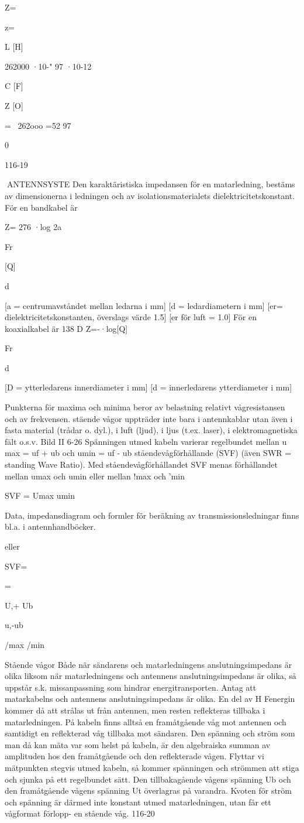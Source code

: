 {{Z=\ 

z=

L [H]

262000 ·10-"
97 ·10-12

C [F]

Z [O]

=~ 262ooo =52
97

0

116-19

ANTENNSYSTE
Den karaktäristiska impedansen för en
matarledning, bestäms av dimensionerna i
ledningen och av isolationsmaterialets dielektricitetskonstant.
För en bandkabel är

Z= 276 ·log 2a

Fr

[Q]

d

[a = centrumavståndet mellan ledarna i
mm]
[d = ledardiametern i mm]
[er= dielektricitetskonstanten, överslags
värde 1.5]
[er för luft = 1.0]
För en koaxialkabel är
138
D
Z=-·log[Q]

Fr

d

[D = ytterledarens innerdiameter i mm]
[d = innerledarens ytterdiameter i mm]

Punkterna för maxima och minima beror
av belastning relativt vågresistansen och av
frekvensen.
stäende vågor uppträder inte bara i
antennkablar utan även i fasta material (trådar o. dyl.), i luft (ljud), i ljus (t.ex. laser), i
elektromagnetiska fält o.s.v.
Bild II 6-26
Spänningen utmed kabeln varierar regelbundet mellan
u max = uf + ub och umin = uf - ub
ståendevågförhållande (SVF)
(även SWR = standing Wave Ratio).
Med ståendevågförhållandet SVF menas
förhållandet mellan
umax och umin eller mellan !max och 'min

SVF = Umax
umin

Data, impedansdiagram och formler för
beräkning av transmissionsledningar finns
bl.a. i antennhandböcker.

eller

SVF=

=

U,+ Ub

u,-ub

/max
/min

Stående vågor
Både när sändarens och matarledningens
anslutningsimpedans är olika liksom när
matarledningens och antennens anslutningsimpedans är olika, så uppstår s.k. missanpassning som hindrar energitransporten.
Antag att matarkabelns och antennens
anslutningsimpedans är olika. En del av H Fenergin kommer då att strålas ut från antennen, men resten reflekteras tillbaka i matarledningen. På kabeln finns alltså en framåtgående våg mot antennen och samtidigt en
reflekterad våg tillbaka mot sändaren.
Den spänning och ström som man då
kan mäta var som helst på kabeln, är den
algebraiska summan av amplituden hos den
framåtgående och den reflekterade vågen.
Flyttar vi mätpunkten stegvis utmed kabeln, så kommer spänningen och strömmen
att stiga och sjunka på ett regelbundet sätt.
Den tillbakagående vågens spänning Ub
och den framåtgående vågens spänning Ut
överlagras på varandra. Kvoten för ström
och spänning är därmed inte konstant utmed matarledningen, utan får ett vågformat
förlopp- en stående våg.
116-20

}}
